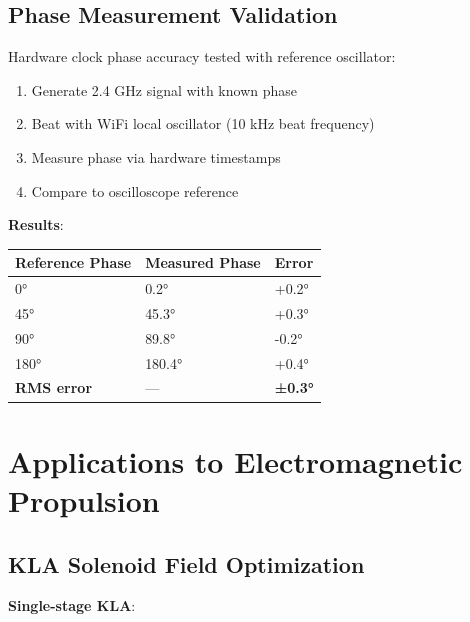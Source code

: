 \documentclass[12pt,a4paper]{article}
\begin{document}
\subsection{Phase Measurement Validation}

Hardware clock phase accuracy tested with reference oscillator:

\begin{enumerate}
\item Generate 2.4 GHz signal with known phase
\item Beat with WiFi local oscillator (10 kHz beat frequency)
\item Measure phase via hardware timestamps
\item Compare to oscilloscope reference
\end{enumerate}

\textbf{Results}:
\begin{center}
\begin{tabular}{|l|l|l|}
\hline
\textbf{Reference Phase} & \textbf{Measured Phase} & \textbf{Error} \\
\hline
0° & 0.2° & +0.2° \\
45° & 45.3° & +0.3° \\
90° & 89.8° & -0.2° \\
180° & 180.4° & +0.4° \\
\hline
\textbf{RMS error} & — & \textbf{±0.3°} \\
\hline
\end{tabular}
\end{center}

\section{Applications to Electromagnetic Propulsion}

\subsection{KLA Solenoid Field Optimization}

\textbf{Single-stage KLA}:

\begin{center}
\end{center}
\end{document}
